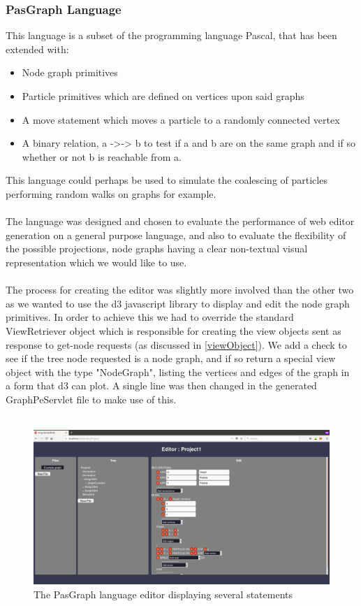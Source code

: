 \documentclass{article}
\begin{document}
\subsubsection{PasGraph Language}\label{pasgraph}
This language is a subset of the programming language Pascal\cite{pascal}, that has been extended with: 
\begin{itemize}
\item Node graph primitives
\item Particle primitives which are defined on vertices upon said graphs
\item A move statement which moves a particle to a randomly connected vertex
\item A binary relation, a ->-> b to test if a and b are on the same graph and if so whether or not b is reachable from a.
\end{itemize}
This language could perhaps be used to simulate the coalescing of particles performing random walks on graphs for example. 
\\
\\
The language was designed and chosen to evaluate the performance of web editor generation on a general purpose language, and also to evaluate the flexibility of the possible projections, node graphs having a clear non-textual visual representation which we would like to use.
\\
\\
The process for creating the editor was slightly more involved than the other two as we wanted to use the d3 javascript library\cite{d3} to display and edit the node graph primitives. In order to achieve this we had to override the standard ViewRetriever object which is responsible for creating the view objects sent as response to get-node requests (as discussed in \ref{viewObject}). We add a check to see if the tree node requested is a node graph, and if so return a special view object with the type "NodeGraph", listing the vertices and edges of the graph in a form that d3 can plot. A single line was then changed in the generated GraphPeServlet file to make use of this.
\\
\\
\begin{figure}[h!]
  \centering
  \includegraphics[width=\linewidth]{./Screenshots/graphUI1.png}
  \caption{The PasGraph language editor displaying several statements}
  \label{fig:pasgraphUI1}
\end{figure}
\end{document}

